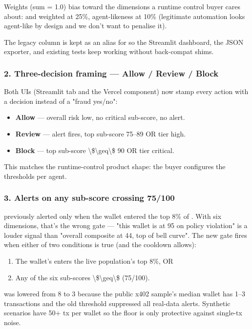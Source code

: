 \documentclass[11pt]{article}
\begin{document}
Weights (sum = 1.0) bias toward the dimensions a runtime control buyer cares about:  and  weighted at 25\%, agent-likeness at 10\% (legitimate automation looks agent-like by design and we don't want to penalise it).

The legacy  column is kept as an alias for  so the Streamlit dashboard, the JSON exporter, and existing tests keep working without back-compat shims.

\subsubsection*{2. Three-decision framing --- Allow / Review / Block}
Both UIs (Streamlit  tab and the Vercel  component) now stamp every action with a decision instead of a "fraud yes/no":

\begin{itemize}
  \item \textbf{Allow} --- overall risk low, no critical sub-score, no alert.
  \item \textbf{Review} --- alert fires, top sub-score 75--89 OR tier high.
  \item \textbf{Block} --- top sub-score \textbackslash{}\$\textbackslash{}geq\textbackslash{}\$ 90 OR tier critical.
\end{itemize}
This matches the runtime-control product shape: the buyer configures the thresholds per agent.

\subsubsection*{3. Alerts on \textbf{any} sub-score crossing 75/100}
 previously alerted only when the wallet entered the top 8\% of . With six dimensions, that's the wrong gate --- "this wallet is at 95 on policy violation" is a louder signal than "overall composite at 44, top of bell curve". The new gate fires when either of two conditions is true (and the cooldown allows):

\begin{enumerate}
  \item The wallet's  enters the live population's top 8\%, OR
  \item Any of the six sub-scores \textbackslash{}\$\textbackslash{}geq\textbackslash{}\$  (75/100).
\end{enumerate}
 was lowered from 8 to 3 because the public x402 sample's median wallet has 1--3 transactions and the old threshold suppressed all real-data alerts. Synthetic scenarios have 50+ tx per wallet so the floor is only protective against single-tx noise.
\end{document}

